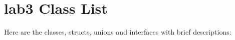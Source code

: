 \section{lab3 Class List}
Here are the classes, structs, unions and interfaces with brief descriptions:\begin{CompactList}
\item{}
\end{CompactList}

